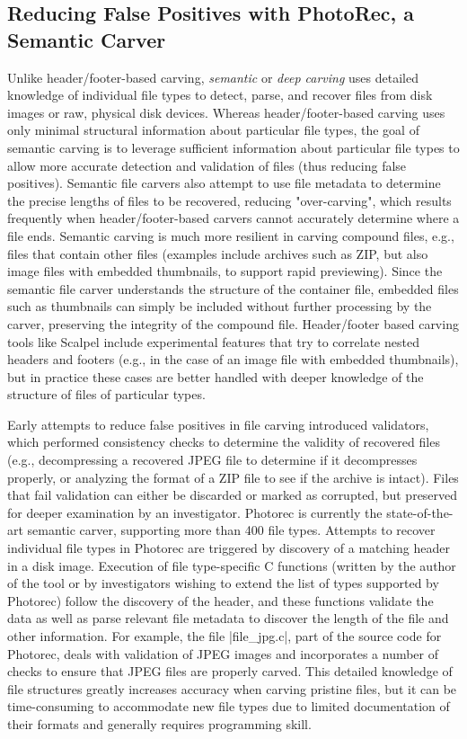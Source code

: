 \subsection{Reducing False Positives with PhotoRec, a Semantic Carver}

Unlike header/footer-based carving, \emph{semantic} or \emph{deep
  carving} uses detailed knowledge of individual file types to detect,
parse, and recover files from disk images or raw, physical disk
devices.  Whereas header/footer-based carving uses only minimal
structural information about particular file types, the goal of
semantic carving is to leverage sufficient information about
particular file types to allow more accurate detection and validation
of files (thus reducing false positives).  Semantic file carvers also
attempt to use file metadata to determine the precise lengths of files
to be recovered, reducing "over-carving", which results frequently
when header/footer-based carvers cannot accurately determine where a
file ends.  Semantic carving is much more resilient in carving
compound files, e.g., files that contain other files (examples include
archives such as ZIP, but also image files with embedded thumbnails,
to support rapid previewing).  Since the semantic file carver
understands the structure of the container file, embedded files such
as thumbnails can simply be included without further processing by the
carver, preserving the integrity of the compound file.  Header/footer
based carving tools like Scalpel include experimental features that
try to correlate nested headers and footers (e.g., in the case of an
image file with embedded thumbnails), but in practice these cases are
better handled with deeper knowledge of the structure of files of
particular types.

Early attempts to reduce false positives in file carving introduced
validators, which performed consistency checks to determine the
validity of recovered files (e.g., decompressing a recovered JPEG file
to determine if it decompresses properly, or analyzing the format of a
ZIP file to see if the archive is intact).  Files that fail validation
can either be discarded or marked as corrupted, but preserved for
deeper examination by an investigator.  Photorec \cite{photorec} is
currently the state-of-the-art semantic carver, supporting more than
400 file types.  Attempts to recover individual file types in Photorec
are triggered by discovery of a matching header in a disk image.
Execution of file type-specific C functions (written by the author of
the tool or by investigators wishing to extend the list of types
supported by Photorec) follow the discovery of the header, and these
functions validate the data as well as parse relevant file metadata to
discover the length of the file and other information.  For example, the file
|file_jpg.c|, part of the source code for Photorec, deals with validation of 
JPEG images and incorporates a number of checks to ensure that JPEG
files are properly carved.  This detailed
knowledge of file structures greatly increases accuracy when carving
pristine files, but it can be time-consuming to accommodate new file
types due to limited documentation of their formats and generally
requires programming skill.

